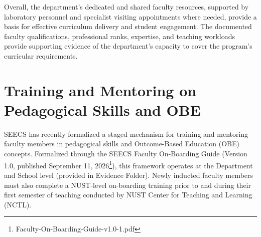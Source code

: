 Overall, the department's dedicated and shared faculty resources, supported by laboratory personnel and specialist visiting appointments where needed, provide a basis for effective curriculum delivery and student engagement. The documented faculty qualifications, professional ranks, expertise, and teaching workloads provide supporting evidence of the department's capacity to cover the program's curricular requirements.






\section{Training and Mentoring on Pedagogical Skills and OBE}
\label{sec:training}

SEECS has recently formalized a staged mechanism for training and mentoring faculty members in pedagogical skills and Outcome-Based Education (OBE) concepts. Formalized through the SEECS Faculty On-Boarding Guide (Version 1.0, published September 11, 2026\footnote{Faculty-On-Boarding-Guide-v1.0-1.pdf}), this framework operates at the Department and School level (provided in Evidence Folder). Newly inducted faculty members must also complete a NUST-level on-boarding training prior to and during their first semester of teaching conducted by NUST Center for Teaching and Learning (NCTL).

